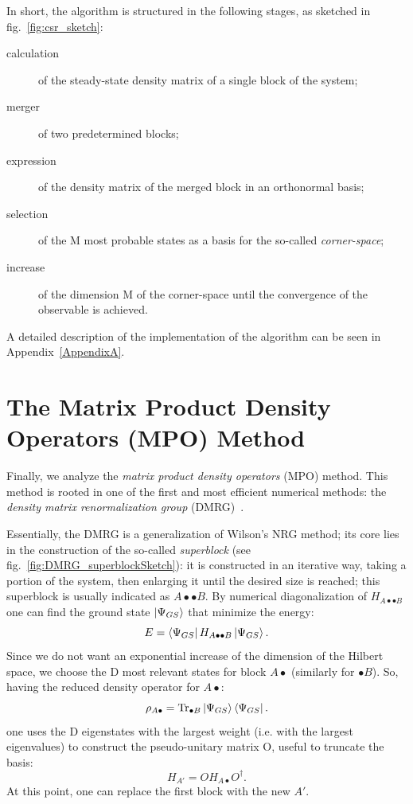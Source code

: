\bigskip
In short, the algorithm is structured in the following stages, as sketched in fig.~\ref{fig:csr_sketch}:
\begin{description}
    \item[calculation] of the steady-state density matrix of a single block of the system;
    \item[merger] of two predetermined blocks;
    \item[expression] of the density matrix of the merged block in an orthonormal basis;
    \item[selection] of the M most probable states as a basis for the so-called \emph{corner-space};
    \item[increase] of the dimension M of the corner-space until the convergence of the observable is achieved.
\end{description}

A detailed description of the implementation of the algorithm can be seen in Appendix~\ref{AppendixA}.


\section{The Matrix Product Density Operators (MPO) Method}
Finally, we analyze the \emph{matrix product density operators} (MPO) method.
This method is rooted in one of the first and most efficient numerical methods: the \emph{density matrix renormalization group} (DMRG)~\cite{s_white:dmrg, PhysRevB.48.10345, RevModPhys.77.259}.

Essentially, the DMRG is a generalization of Wilson's NRG method; its core lies in the construction of the so-called \emph{superblock} (see fig.~\ref{fig:DMRG_superblockSketch}): it is constructed in an iterative way, taking a portion of the system, then enlarging it until the desired size is reached; this superblock is usually indicated as $A \bullet \bullet B$. By numerical diagonalization of $H_{A \bullet \bullet B}$ one can find the ground state $\ket{\Psi_{GS}}$ that minimize the energy:
\begin{equation*}
    E = \bra{\Psi_{GS}} H_{A \bullet \bullet B}\ket{\Psi_{GS}}.
\end{equation*}
Since we do not want an exponential increase of the dimension of the Hilbert space, we choose the D most relevant states for block $A \bullet$ (similarly for $\bullet B$). So, having the reduced density operator for $A \bullet$:
\begin{equation*}
    \rho_{A \bullet} = \operatorname{Tr}_{\bullet B} \ket{\Psi_{GS}}\bra{\Psi_{GS}}.
\end{equation*}
one uses the D eigenstates with the largest weight (i.e. with the largest eigenvalues) to construct the pseudo-unitary matrix O, useful to truncate the basis:
\begin{equation*}
    H_{A'} = OH_{A\bullet}O^\dagger.
\end{equation*}
At this point, one can replace the first block with the new $A'$.

